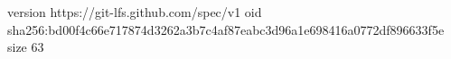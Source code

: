 version https://git-lfs.github.com/spec/v1
oid sha256:bd00f4c66e717874d3262a3b7c4af87eabc3d96a1e698416a0772df896633f5e
size 63

